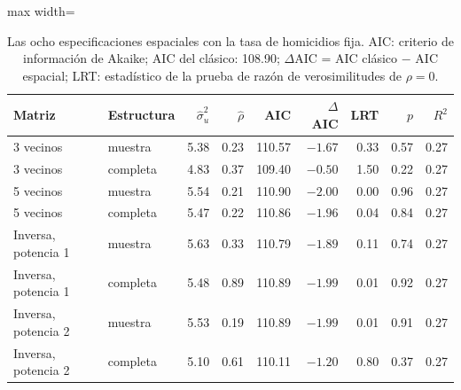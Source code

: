\begin{table}[!htbp]
\centering
\small
\caption[Especificaciones del Fay-Herriot espacial]{Las ocho especificaciones espaciales con la tasa de homicidios fija. AIC: criterio de información de Akaike; AIC del clásico: 108.90; $\Delta$AIC = AIC clásico $-$ AIC espacial; LRT: estadístico de la prueba de razón de verosimilitudes de $\rho = 0$.}
\label{tab:app_espacial}
\begin{adjustbox}{max width=\linewidth}
\begin{tabular}{l l r r r r r r r}
\toprule
Matriz & Estructura & $\hat{\sigma}_u^2$ & $\hat{\rho}$ & AIC & $\Delta$AIC & LRT & $p$ & $R^2$ \\
\midrule
3 vecinos & muestra & 5.38 & 0.23 & 110.57 & $-1.67$ & 0.33 & 0.57 & 0.27 \\
3 vecinos & completa & 4.83 & 0.37 & 109.40 & $-0.50$ & 1.50 & 0.22 & 0.27 \\
5 vecinos & muestra & 5.54 & 0.21 & 110.90 & $-2.00$ & 0.00 & 0.96 & 0.27 \\
5 vecinos & completa & 5.47 & 0.22 & 110.86 & $-1.96$ & 0.04 & 0.84 & 0.27 \\
Inversa, potencia 1 & muestra & 5.63 & 0.33 & 110.79 & $-1.89$ & 0.11 & 0.74 & 0.27 \\
Inversa, potencia 1 & completa & 5.48 & 0.89 & 110.89 & $-1.99$ & 0.01 & 0.92 & 0.27 \\
Inversa, potencia 2 & muestra & 5.53 & 0.19 & 110.89 & $-1.99$ & 0.01 & 0.91 & 0.27 \\
Inversa, potencia 2 & completa & 5.10 & 0.61 & 110.11 & $-1.20$ & 0.80 & 0.37 & 0.27 \\
\bottomrule
\end{tabular}
\end{adjustbox}
\end{table}
